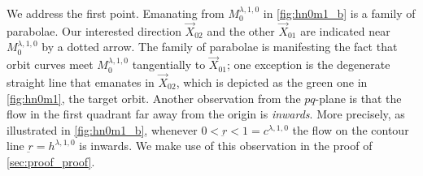 \documentclass[a4paper,11pt]{article}
\numberwithin{step}{dummy}
\begin{document}
We address the first point. Emanating from $M_0^{ \lambda,1,0}$
in \eqref{fig:hn0m1_b} is a family of parabolae. Our interested direction $\vec{X}_{02}$ and the other $\vec{X}_{01}$ are indicated near $M_0^{ \lambda,1,0}$ by a dotted arrow. The family of parabolae is manifesting the fact that orbit curves meet $M_0^{ \lambda,1,0}$ tangentially to $\vec{X}_{01}$; one exception is the degenerate straight line that emanates in $\vec{X}_{02}$, which is depicted as the green one in \eqref{fig:hn0m1}, the target orbit. Another observation from the $pq$-plane is that the flow in the first quadrant far away from the origin is {\it inwards}. More precisely, as illustrated in \eqref{fig:hn0m1_b}, whenever $0<\underbar{r} < 1 = c^{\lambda,1,0}$ the flow on the contour line $\underbar{r} = h^{\lambda,1,0}$ is inwards. We make use of this observation in the proof of \eqref{sec:proof_proof}.
\end{document}
